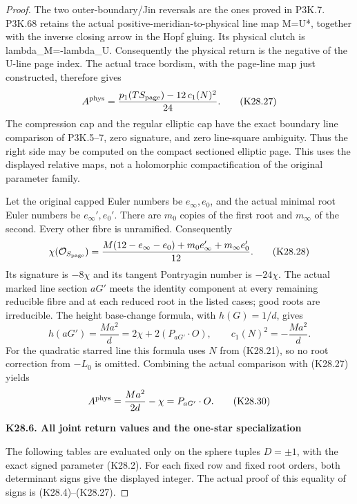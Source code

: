 \begin{proof}
The two outer-boundary/Jin reversals are the ones proved in
P3K.7. P3K.68 retains the actual positive-meridian-to-physical
line map M=U*, together with the inverse closing arrow in the Hopf
gluing. Its physical clutch is lambda\_M=-lambda\_U. Consequently
the physical return is the negative of the U-line page index.
The actual trace bordism, with the page-line map just constructed,
therefore gives
\[
            A^{\rm phys}
              =\frac{p_1(TS_{\rm page})-12\,c_1(N)^2}{24}.
 \tag{K28.27}
\]
The compression cap and the regular elliptic cap have the exact
boundary line comparison of P3K.5--7, zero signature, and zero
line-square ambiguity. Thus the right side may be computed on
the compact sectioned elliptic page. This uses the displayed
relative maps, not a holomorphic compactification of the original
parameter family.

Let the original capped Euler numbers be \(e_\infty,e_0\),
and the actual minimal root Euler numbers be
\(e_\infty',e_0'\). There are \(m_0\) copies of the first root
and \(m_\infty\) of the second. Every other fibre is unramified.
Consequently
\[
 \chi(\mathcal O_{S_{\rm page}})
   =\frac{M(12-e_\infty-e_0)
            +m_0e_\infty'+m_\infty e_0'}{12}.
 \tag{K28.28}
\]
Its signature is \(-8\chi\) and its tangent Pontryagin number is
\(-24\chi\). The actual marked line section \(aG'\) meets the
identity component at every remaining reducible fibre and at
each reduced root in the listed cases; good roots are irreducible.
The height base-change formula, with \(h(G)=1/d\), gives
\[
 h(aG')=\frac{Ma^2}{d}
       =2\chi+2(P_{aG'}\cdot O),\qquad
 c_1(N)^2=-\frac{Ma^2}{d}.
 \tag{K28.29}
\]
For the quadratic starred line this formula uses \(N\) from
(K28.21), so no root correction from \(-L_0\) is omitted.
Combining the actual comparison with (K28.27) yields
\[
                    A^{\rm phys}
                         =\frac{Ma^2}{2d}-\chi
                         =P_{aG'}\cdot O .
 \tag{K28.30}
\]

\par

\medskip\noindent\textbf{K28.6. All joint return values and the one-star specialization}

\par\nobreak

The following tables are evaluated only on the sphere tuples
\(D=\pm1\), with the exact signed parameter (K28.2). For each
fixed row and fixed root orders, both determinant signs give
the displayed integer. The actual proof of this equality of
signs is (K28.4)--(K28.27).


\end{proof}
